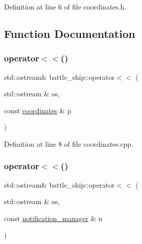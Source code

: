 Definition at line 6 of file coordinates.\+h.



\subsection{Function Documentation}
\mbox{\label{namespacebattle__ship_ac73c2d37116f5d6ed25e71eef5c37dc8}} 
\subsubsection{\texorpdfstring{operator$<$$<$()}{operator<<()}\hspace{0.1cm}{\footnotesize\ttfamily [1/3]}}
{\footnotesize\ttfamily std\+::ostream\& battle\+\_\+ship\+::operator$<$$<$ (\begin{DoxyParamCaption}\item[{std\+::ostream \&}]{os,  }\item[{const \hyperlink{structbattle__ship_1_1coordinates}{coordinates} \&}]{p }\end{DoxyParamCaption})}



Definition at line 8 of file coordinates.\+cpp.

\mbox{\label{namespacebattle__ship_a1a93528abeff933fb4839aa528313c51}} 
\subsubsection{\texorpdfstring{operator$<$$<$()}{operator<<()}\hspace{0.1cm}{\footnotesize\ttfamily [2/3]}}
{\footnotesize\ttfamily std\+::ostream\& battle\+\_\+ship\+::operator$<$$<$ (\begin{DoxyParamCaption}\item[{std\+::ostream \&}]{os,  }\item[{const \hyperlink{classbattle__ship_1_1notification__manager}{notification\+\_\+manager} \&}]{n }\end{DoxyParamCaption})}



